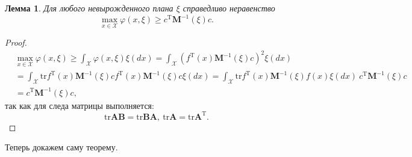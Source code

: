 \documentclass[12pt, a4paper]{article}
\newtheorem{lemma}{Лемма}
\begin{document}
	\begin{lemma}
		Для любого невырожденного плана $\xi$ справедливо неравенство
		\begin{equation*}
			\max_{x\in\mathcal{X}}\varphi(x,\xi)\geqslant c^\mathrm{T}\mathbf{M}^{-1}(\xi)c.
		\end{equation*}
	\end{lemma}
	\begin{proof}
		\begin{align*}
			&\max_{x\in\mathcal{X}}\varphi(x,\xi)\geqslant\int_\mathcal{X}\varphi(x,\xi)\xi(dx)=\int_\mathcal{X}(f^\mathrm{T}(x)\mathbf{M}^{-1}(\xi)c)^2\xi(dx)\\
			&=\int_\mathcal{X}\textrm{tr}f^\mathrm{T}(x)\mathbf{M}^{-1}(\xi)cf^\mathrm{T}(x)\mathbf{M}^{-1}(\xi)c\xi(dx)=\int_\mathcal{X}\textrm{tr}f^\mathrm{T}(x)\mathbf{M}^{-1}(\xi)f(x)\xi(dx)~c^\mathrm{T}\mathbf{M}^{-1}(\xi)c\\
			&=c^\mathrm{T}\mathbf{M}^{-1}(\xi)c,
		\end{align*}
		так как для следа матрицы выполняется:
		\begin{equation*}
			\mathrm{tr}\mathbf{AB}=\mathrm{tr}\mathbf{BA},~\mathrm{tr}\mathbf{A}=\mathrm{tr}\mathbf{A}^\mathrm{T}.
		\end{equation*}
	\end{proof}
	Теперь докажем саму теорему.
\end{document}
